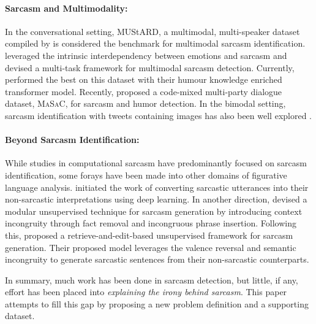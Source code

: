 \documentclass[11pt]{article}
\begin{document}
\paragraph{Sarcasm and Multimodality:} 
In the conversational setting, MUStARD, a multimodal, multi-speaker dataset compiled by \citet{castro2019multimodal} is considered the benchmark for multimodal sarcasm identification. \citet{chauhan-etal-2020-sentiment} leveraged the intrinsic interdependency between emotions and sarcasm and devised a multi-task framework for multimodal sarcasm detection. Currently, \citet{Hasan_Lee_Rahman_Zadeh_Mihalcea_Morency_Hoque_2021} performed the best on this dataset with their humour knowledge enriched transformer model. Recently, \citet{9442359} proposed a code-mixed multi-party dialogue dataset, \textsc{MaSaC}, for sarcasm and humor detection. In the bimodal setting, sarcasm identification with tweets containing images has also been well explored \citep{cai-etal-2019-multi, xu-etal-2020-reasoning, pan-etal-2020-modeling} .

\paragraph{Beyond Sarcasm Identification:} While studies in computational sarcasm have predominantly focused on sarcasm identification, some forays have been made into other domains of figurative language analysis. \citet{dubey2019deep} initiated the work of converting sarcastic utterances into their non-sarcastic interpretations using deep learning. In another direction, \citet{mishra-etal-2019-modular} devised a modular unsupervised technique for sarcasm generation by introducing context incongruity through fact removal and incongruous phrase insertion. Following this, \citet{chakrabarty-etal-2020-r} proposed a retrieve-and-edit-based unsupervised framework for sarcasm generation. Their proposed model leverages the valence reversal and semantic incongruity to generate sarcastic sentences from their non-sarcastic counterparts. 

In summary, much work has been done in sarcasm detection, but little, if any, effort has been placed into {\em explaining the irony behind sarcasm}. This paper attempts to fill this gap by proposing a new problem definition and a supporting dataset.
\end{document}
